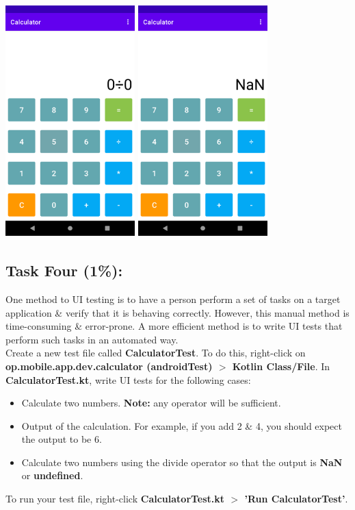 \documentclass{article}
\begin{document}
\includegraphics[width=5cm, height=9cm]{../tex/img/practicals/02-calculator-5.png}
\includegraphics[width=5cm, height=9cm]{../tex/img/practicals/02-calculator-6.png}

\subsection*{Task Four (1\%):} 
One method to UI testing is to have a person perform a set of tasks on a target application \& verify that it is behaving correctly. However, this manual method is time-consuming \& error-prone. A more efficient method is to write UI tests that perform such tasks in an automated way. \\

Create a new test file called \textbf{CalculatorTest}. To do this, right-click on \textbf{op.mobile.app.dev.calculator (androidTest) $>$ Kotlin Class/File}. In \textbf{CalculatorTest.kt}, write UI tests for the following cases:

\begin{itemize}
	\item Calculate two numbers. \textbf{Note:} any operator will be sufficient.
	\item Output of the calculation. For example, if you add 2 \& 4, you should expect the output to be 6.
	\item Calculate two numbers using the divide operator so that the output is \textbf{NaN} or \textbf{undefined}.
\end{itemize}

To run your test file, right-click \textbf{CalculatorTest.kt $>$ 'Run CalculatorTest'}.
\end{document}
